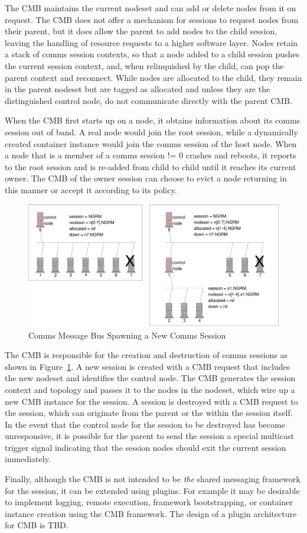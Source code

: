 The CMB maintains the current nodeset and can add or delete nodes
from it on request.  The CMB does not offer a mechanism for sessions
to request nodes from their parent, but it does allow the parent
to add nodes to the child session, leaving the handling of resource
requests to a higher software layer.  Nodes retain a stack of comms
session contexts, so that a node added to a child session pushes the current
session context, and, when relinquished by the child, can pop the parent
context and reconnect.
While nodes are allocated to the child, they remain in the parent nodeset
but are tagged as allocated and unless they are the distinguished control
node, do not communicate directly with the parent CMB.

When the CMB first starts up on a node, it obtains information about its
comms session out of band.
A real node would join the root session, while a dynamically created
container instance would join the comms session of the host node.
When a node that is a member of a comms session != 0 crashes and
reboots, it reports to the root session and is re-added from child to
child until it reaches its current owner.  The CMB of the owner session
can choose to evict a node returning in this manner or accept it
according to its policy.

\begin{figure}
\centering
\includegraphics[scale=0.50]{../fig/cmb.eps}
\caption{Comms Message Bus Spawning a New Comms Session}
\label{FigCMBSpawn}
\end{figure}

The CMB is responsible for the creation and destruction of
comms sessions as shown in Figure~\ref{FigCMBSpawn}.
A new session is created with a CMB request that
includes the new nodeset and identifies the control node.  The CMB
generates the session context and topology and passes it to the nodes
in the nodeset, which wire up a new CMB instance for the session.
A session is destroyed with a CMB request to the session,
which can originate from the parent or the within the session itself.
In the event that the control node for the session to be destroyed has become
unresponsive, it is possible for the parent to send the session a
special multicast trigger signal indicating that the session nodes
should exit the current session immediately.

Finally, although the CMB is not intended to be {\em the} shared messaging
framework for the session, it can be extended using plugins.
For example it may be desirable to implement logging, remote execution,
framework bootstrapping, or container instance creation using the
CMB framework.  The design of a plugin architecture for CMB is TBD.
